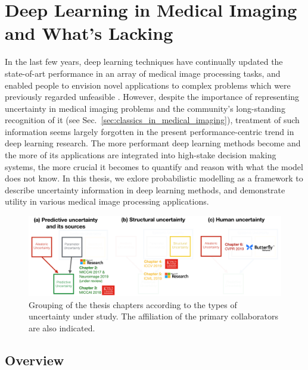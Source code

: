 \section{Deep Learning in Medical Imaging and What's Lacking} 
In the last few years, deep learning techniques have continually updated the state-of-art performance in an array of medical image processing tasks, and enabled people to envision novel applications to complex problems which were previously regarded unfeasible \cite{shen2017deep,litjens2017survey}. However, despite the importance of representing uncertainty in medical imaging problems and the community's long-standing recognition of it (see Sec.~\ref{sec:classics_in_medical_imaging}), treatment of such information seems largely forgotten in the present performance-centric trend in deep learning research. The more performant deep learning methods become and the more of its applications are integrated into high-stake decision making systems, the more crucial it becomes to quantify and reason with what the model does not know. In this thesis, we exlore probabilistic modelling as a framework to describe uncertainty information in deep learning methods, and demonstrate utility in various medical image processing applications. 

\begin{figure}[ht]
	\includegraphics[width=\linewidth]{chapter_1/thesis_structure_02.png}
	\centering	
	\vspace{-2mm}
	\caption{\small Grouping of the thesis chapters according to the types of uncertainty under study. The affiliation of the primary collaborators are also indicated. } 
	\label{fig:thesis_structure}
\end{figure}

\subsection*{Overview}


